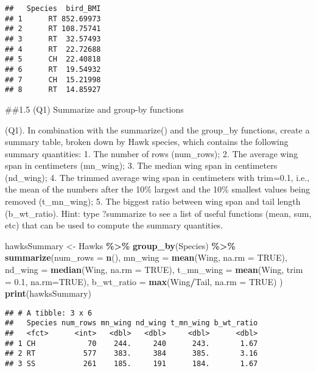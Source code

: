 \documentclass[
]{article}
\newenvironment{Shaded}{\begin{snugshade}}{\end{snugshade}}
\newcommand{\AttributeTok}[1]{\textcolor[rgb]{0.13,0.29,0.53}{#1}}
\newcommand{\ConstantTok}[1]{\textcolor[rgb]{0.56,0.35,0.01}{#1}}
\newcommand{\FloatTok}[1]{\textcolor[rgb]{0.00,0.00,0.81}{#1}}
\newcommand{\FunctionTok}[1]{\textcolor[rgb]{0.13,0.29,0.53}{\textbf{#1}}}
\newcommand{\NormalTok}[1]{#1}
\newcommand{\OtherTok}[1]{\textcolor[rgb]{0.56,0.35,0.01}{#1}}
\newcommand{\SpecialCharTok}[1]{\textcolor[rgb]{0.81,0.36,0.00}{\textbf{#1}}}
\begin{document}
\begin{verbatim}
##   Species  bird_BMI
## 1      RT 852.69973
## 2      RT 108.75741
## 3      RT  32.57493
## 4      RT  22.72688
## 5      CH  22.40818
## 6      RT  19.54932
## 7      CH  15.21998
## 8      RT  14.85927
\end{verbatim}

\#\#1.5 (Q1) Summarize and group-by functions

(Q1). In combination with the summarize() and the group\_by functions,
create a summary table, broken down by Hawk species, which contains the
following summary quantities: 1. The number of rows (num\_rows); 2. The
average wing span in centimeters (mn\_wing); 3. The median wing span in
centimeters (nd\_wing); 4. The trimmed average wing span in centimeters
with trim=0.1, i.e., the mean of the numbers after the 10\% largest and
the 10\% smallest values being removed (t\_mn\_wing); 5. The biggest
ratio between wing span and tail length (b\_wt\_ratio). Hint: type
?summarize to see a list of useful functions (mean, sum, etc) that can
be used to compute the summary quantities.

\begin{Shaded}
\begin{Highlighting}[]
\NormalTok{hawksSummary }\OtherTok{\textless{}{-}}\NormalTok{ Hawks }\SpecialCharTok{\%\textgreater{}\%}
  \FunctionTok{group\_by}\NormalTok{(Species) }\SpecialCharTok{\%\textgreater{}\%} 
  \FunctionTok{summarize}\NormalTok{(}\AttributeTok{num\_rows =} \FunctionTok{n}\NormalTok{(), }
            \AttributeTok{mn\_wing =} \FunctionTok{mean}\NormalTok{(Wing, }\AttributeTok{na.rm =} \ConstantTok{TRUE}\NormalTok{),}
            \AttributeTok{nd\_wing =} \FunctionTok{median}\NormalTok{(Wing, }\AttributeTok{na.rm =} \ConstantTok{TRUE}\NormalTok{),}
            \AttributeTok{t\_mn\_wing =} \FunctionTok{mean}\NormalTok{(Wing, }\AttributeTok{trim =} \FloatTok{0.1}\NormalTok{, }\AttributeTok{na.rm=}\ConstantTok{TRUE}\NormalTok{),}
            \AttributeTok{b\_wt\_ratio =} \FunctionTok{max}\NormalTok{(Wing}\SpecialCharTok{/}\NormalTok{Tail, }\AttributeTok{na.rm =} \ConstantTok{TRUE}\NormalTok{)}
\NormalTok{              )}
\FunctionTok{print}\NormalTok{(hawksSummary)}
\end{Highlighting}
\end{Shaded}

\begin{verbatim}
## # A tibble: 3 x 6
##   Species num_rows mn_wing nd_wing t_mn_wing b_wt_ratio
##   <fct>      <int>   <dbl>   <dbl>     <dbl>      <dbl>
## 1 CH            70    244.     240      243.       1.67
## 2 RT           577    383.     384      385.       3.16
## 3 SS           261    185.     191      184.       1.67
\end{verbatim}
\end{document}
